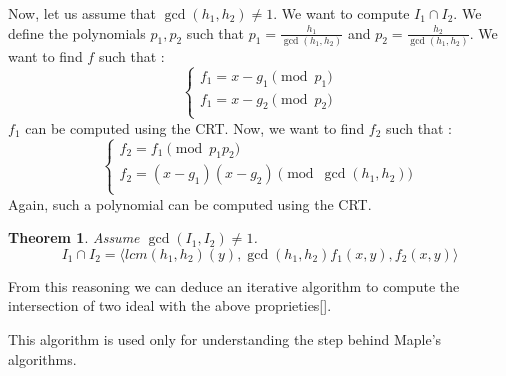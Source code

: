 \documentclass{article}
\newtheorem{theorem}{Theorem}[section]
\begin{document}
Now, let us assume that $\gcd(h_{1}, {h_2}) \neq 1$. 
We want to compute $I_{1} \cap I_{2}$. We define the polynomials $p_{1}, p_{2}$ such that $p_{1} = \displaystyle \frac{h_{1}}{\gcd(h_{1}, h_{2})}$ and $p_{2} = \displaystyle \frac{h_{2}}{\gcd(h_{1}, h_{2})}$. We want to find $f$ such that : 
\begin{displaymath}
    \left\{
    \begin{array}{ll}
        f_{1} = x-g_{1} \pmod {p_{1}} \\
        f_{1} = x-g_{2} \pmod {p_{2}} \\
    \end{array}
    \right.
\end{displaymath}
$f_{1}$ can be computed using the CRT. Now, we want to find $f_{2}$ such that : 
\begin{displaymath}
    \left\{
    \begin{array}{ll}
        f_{2} = f_{1} \pmod {p_{1}p_{2}} \\
        f_{2} = (x-g_{1})(x-g_{2}) \pmod {\gcd(h_{1}, h_{2})} \\
    \end{array}
    \right.
\end{displaymath}
Again, such a polynomial can be computed using the CRT. 

\begin{theorem}
    Assume $\gcd(I_{1}, I_{2}) \neq 1$. 
    \begin{displaymath}
        I_{1} \cap I_{2} = \langle lcm(h_{1}, h_{2})(y), \gcd(h_{1},h_{2})f_{1}(x,y), f_{2}(x,y) \rangle
    \end{displaymath}
\end{theorem}

From this reasoning we can deduce an iterative algorithm to compute the intersection of two ideal with the above proprieties[].


This algorithm is used only for understanding the step behind Maple's algorithms.
\end{document}
